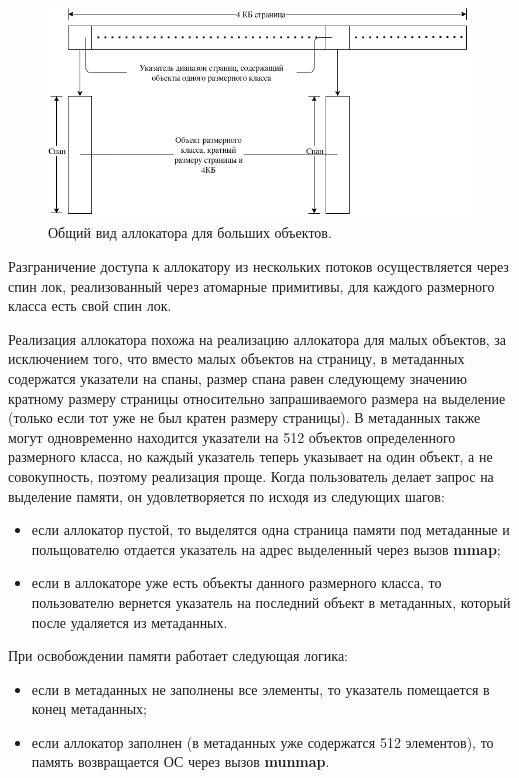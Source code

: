 \begin{figure}[!h]
	\begin{center}
		\includegraphics[scale=0.6]{images/large-allocator-design.png}
		\caption{Общий вид аллокатора для больших объектов.}
		\label{large-allocator-design}
	\end{center}
\end{figure}

Разграничение доступа к аллокатору из нескольких потоков осуществляется через спин лок\cite{spinlock}, реализованный через атомарные примитивы, для каждого размерного класса есть свой спин лок.

Реализация аллокатора похожа на реализацию аллокатора для малых объектов, за исключением того, что вместо малых объектов на страницу, в метаданных содержатся указатели на спаны, размер спана равен следующему значению кратному размеру страницы относительно запрашиваемого размера на выделение (только если тот уже не был кратен размеру страницы). В метаданных также могут одновременно находится указатели на 512 объектов определенного размерного класса, но каждый указатель теперь указывает на один объект, а не совокупность, поэтому реализация проще. Когда пользователь делает запрос на выделение памяти, он удовлетворяется по исходя из следующих шагов:
\begin{itemize}
	\item если аллокатор пустой, то выделятся одна страница памяти под метаданные и польщователю отдается указатель на адрес выделенный через вызов \textbf{mmap};
	\item если в аллокаторе уже есть объекты данного размерного класса, то пользователю вернется указатель на последний объект в метаданных, который после удаляется из метаданных.
\end{itemize}

При освобождении памяти работает следующая логика:
\begin{itemize}
	\item если в метаданных не заполнены все элементы, то указатель помещается в конец метаданных;
	\item если аллокатор заполнен (в метаданных уже содержатся 512 элементов), то память возвращается ОС через вызов \textbf{munmap}.
\end{itemize}

